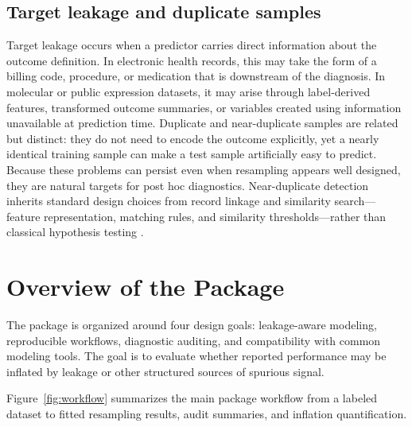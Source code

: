 \documentclass[article,shortnames]{jss}
\begin{document}
\subsection{Target leakage and duplicate samples}

Target leakage occurs when a predictor carries direct information about the outcome definition. In electronic health records, this may take the form of a billing code, procedure, or medication that is downstream of the diagnosis. In molecular or public expression datasets, it may arise through label-derived features, transformed outcome summaries, or variables created using information unavailable at prediction time. Duplicate and near-duplicate samples are related but distinct: they do not need to encode the outcome explicitly, yet a nearly identical training sample can make a test sample artificially easy to predict. Because these problems can persist even when resampling appears well designed, they are natural targets for post hoc diagnostics. Near-duplicate detection inherits standard design choices from record linkage and similarity search---feature representation, matching rules, and similarity thresholds---rather than classical hypothesis testing \citep{winkler1999, christen2012, leskovec2014}.

\section[Overview of the bioLeak Package]{Overview of the  Package}\label{sec:overview}

The package is organized around four design goals: leakage-aware modeling,
reproducible workflows, diagnostic auditing, and compatibility with common 
modeling tools. The goal is to evaluate whether reported performance may be inflated by leakage or other structured sources of spurious signal.

Figure~\ref{fig:workflow} summarizes the main package workflow from a labeled
dataset to fitted resampling results, audit summaries, and inflation
quantification.
\end{document}

